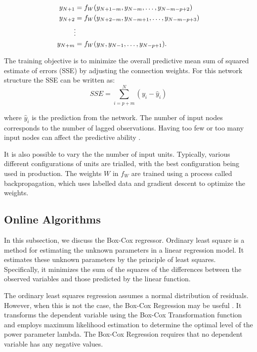 \documentclass[final,3p,times,twocolumn,numbers]{elsarticle}
\begin{document}
\begin{align}
y_{N+1} & =f_{W}(y_{N+1-m}, y_{N-m},\ldots,y_{N-m-p+2})\\
y_{N+2} & =f_{W}(y_{N+2-m}, y_{N-m+1},\ldots,y_{N-m-p+3})\\
&\vdotswithin  \notag \\
y_{N+m} & =f_{W}(y_{N},y_{N-1},\ldots,y_{N-p+1}).
\end{align}

The training objective is to minimize the overall predictive mean sum of squared estimate of errors (SSE) by adjusting the connection weights. For this network structure the SSE can be written as:
\begin{equation}
SSE = \sum_{i=p+m}^N(y_i-\hat{y}_i)
\end{equation}

\noindent where $\hat{y}_i$ is the prediction from the network. The number of input nodes corresponds to the number of lagged observations. Having too few or too many input nodes can affect the predictive ability \cite{Pao2007}.

It is also possible to vary the the number of input units. Typically, various different configurations of units are trialled, with the best configuration being used in production. The weights $W$ in $f_W$ are trained using a process called backpropagation, which uses labelled data and gradient descent to optimize the weights.

\subsection{Online Algorithms}


In this subsection, we discuss the Box-Cox regressor. Ordinary least square is a method for estimating the unknown parameters in a linear regression model. It estimates these unknown parameters by the principle of least squares. Specifically, it minimizes the sum of the squares of the differences between the observed variables and those predicted by the linear function.

The ordinary least squares regression assumes a normal distribution of residuals. However, when this is not the case, the Box-Cox Regression may be useful \cite{Box1964}. It transforms the dependent variable using the Box-Cox Transformation function and employs maximum likelihood estimation to determine the optimal level of the power parameter lambda. The Box-Cox Regression requires that no dependent variable has any negative values.
\end{document}
